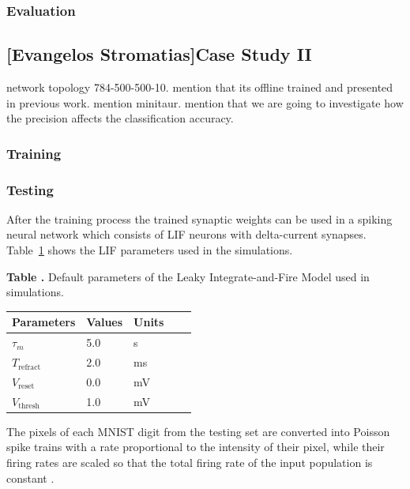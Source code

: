 \subsubsection{Evaluation}

\subsection{[Evangelos Stromatias]Case Study II}
network topology 784-500-500-10. mention that its offline trained and presented in previous work. mention minitaur. mention that we are going to investigate how the precision affects the classification accuracy.

\subsubsection{Training}
\citet{10.3389/fnins.2013.00178}
\subsubsection{Testing}
After the training process the trained synaptic weights can be used in a spiking neural network which consists of LIF neurons with delta-current synapses. Table~\ref{Tab:NeuralParams} shows the LIF parameters used in the simulations.

\begin{table}%
\textbf{\label{Tab:NeuralParams} Table .}{ Default parameters of the Leaky Integrate-and-Fire Model used in simulations.}

\processtable{}
{\begin{tabular}{lllll}\toprule
Parameters & Values & Units \\\midrule
$\tau_{m}$ 		 & 5.0 & s  \\
$T_{\mathrm{refract}}$ & 2.0 & ms \\
$V_{\mathrm{reset}}$ 		 & 0.0 & mV \\
$V_{\mathrm{thresh}}$ 		 & 1.0 & mV \\
\end{tabular}}{}
\end{table}


The pixels of each MNIST digit from the testing set are converted into Poisson spike trains with a rate proportional to the intensity of their pixel, while their firing rates are scaled so that the total firing rate of the input population is constant \citep{10.3389/fnins.2013.00178}.


